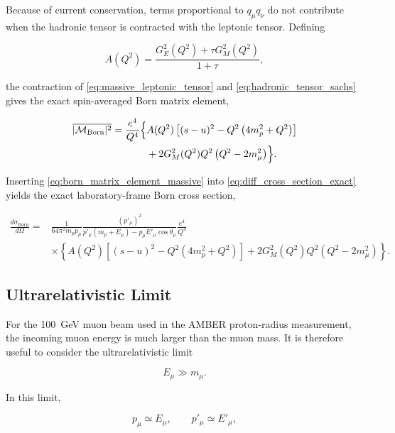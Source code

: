 Because of current conservation, terms proportional to \(q_\mu q_\nu\) do not contribute when the hadronic tensor is contracted with the leptonic tensor. Defining

\begin{equation}
A(Q^2)
=
\frac{G_E^2(Q^2)+\tau G_M^2(Q^2)}
{1+\tau},
\end{equation}

the contraction of \autoref{eq:massive_leptonic_tensor} and \autoref{eq:hadronic_tensor_sachs} gives the exact spin-averaged Born matrix element,

\begin{equation}
\begin{split}
\overline{|\mathcal{M}_{\mathrm{Born}}|^2}
=
\frac{e^4}{Q^4}
\Bigl\{&
A(Q^2)
\left[
(s-u)^2
-
Q^2\left(4m_p^2+Q^2\right)
\right]
\\
&+
2G_M^2(Q^2)Q^2
\left(Q^2-2m_\mu^2\right)
\Bigr\}.
\end{split}
\label{eq:born_matrix_element_massive}
\end{equation}

Inserting \autoref{eq:born_matrix_element_massive} into \autoref{eq:diff_cross_section_exact} yields the exact laboratory-frame Born cross section,

\begin{equation}
\begin{split}
\frac{d\sigma_{\mathrm{Born}}}{d\Omega}
={}&
\frac{1}{64\pi^2m_p p_\mu}
\frac{(p'_\mu)^2}
{
p'_\mu(m_p+E_\mu)
-
p_\mu E'_\mu\cos\theta_\mu
}
\frac{e^4}{Q^4}
\\
&\times
\left\{
A(Q^2)
\left[
(s-u)^2
-
Q^2\left(4m_p^2+Q^2\right)
\right]
+
2G_M^2(Q^2)Q^2
\left(Q^2-2m_\mu^2\right)
\right\}.
\end{split}
\label{eq:born_cross_section_exact}
\end{equation}


\subsection{Ultrarelativistic Limit}

For the \SI{100}{GeV} muon beam used in the AMBER proton-radius measurement, the incoming muon energy is much larger than the muon mass. It is therefore useful to consider the ultrarelativistic limit

\[
E_\mu\gg m_\mu.
\]

In this limit,

\[
p_\mu\simeq E_\mu,
\qquad
p'_\mu\simeq E'_\mu,
\]

